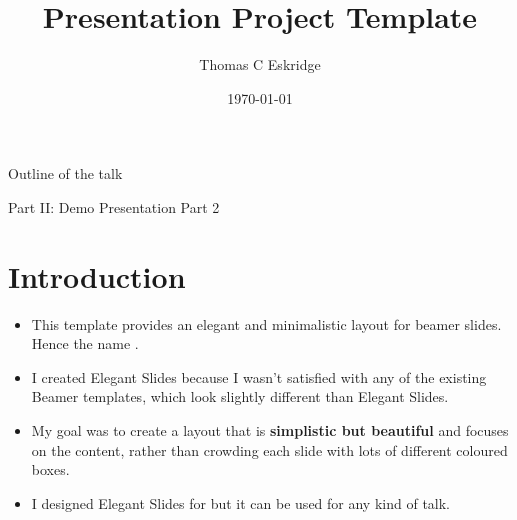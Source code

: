 \documentclass[
14pt,notheorems,hyperref={pdfauthor=whatever}
]{beamer}
\title[
]{Presentation Project Template}
\author[
Thomas C Eskridge %
]{
    Thomas C Eskridge
}
\institute{
    Computer Science and Human-Centered Design, \\
    Florida Institute of Technology\\
\vspace{0.5em}
}
\date{\today}
\begin{document}
{
\begin{frame}
  \titlepage
\end{frame}
}
\addtocounter{framenumber}{-1}

\begin{frame}{Outline of the talk}
    \tableofcontents[part=1]
\end{frame}
\begin{frame}{Part II: Demo Presentation Part 2}
    \tableofcontents[part=2]
\end{frame}

\section{Introduction}
\begin{frame}
\begin{itemize}
    \item This template provides an elegant and minimalistic layout for beamer slides. Hence the name .
    \item I created Elegant Slides because I wasn't satisfied with any of the existing Beamer templates, which look slightly different than Elegant Slides.
    \item My goal was to create a layout that is \alert{\textbf{simplistic but beautiful}} and focuses on the content, rather than crowding each slide with lots of different coloured boxes.
    \item I designed Elegant Slides for  but it can be used for any kind of talk. 
\end{itemize}
\end{frame}
\end{document}
